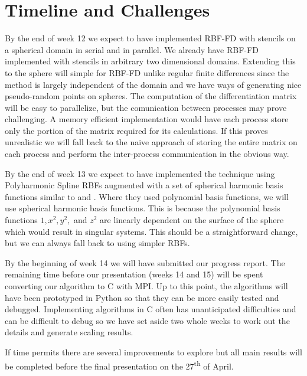 \documentclass[12pt]{article}
\begin{document}
\section{Timeline and Challenges}
	By the end of week 12 we expect to have implemented RBF-FD with stencils on a spherical domain in serial and in parallel. We already have RBF-FD implemented with stencils in arbitrary two dimensional domains. Extending this to the sphere will simple for RBF-FD unlike regular finite differences since the method is largely independent of the domain and we have ways of generating nice pseudo-random points on spheres. The computation of the differentiation matrix will be easy to parallelize, but the comunication between processes may prove challenging. A memory efficient implementation would have each process store only the portion of the matrix required for its calculations. If this proves unrealistic we will fall back to the naive approach of storing the entire matrix on each process and perform the inter-process communication in the obvious way.
	
	By the end of week 13 we expect to have implemented the technique using Polyharmonic Spline RBFs augmented with a set of spherical harmonic basis functions similar to \cite{Flyer2016-1} and \cite{Flyer2017-2}. Where they used polynomial basis functions, we will use spherical harmonic basis functions. This is because the polynomial basis functions $1, x^2, y^2,$ and $z^2$ are linearly dependent on the surface of the sphere which would result in singular systems. This should be a straightforward change, but we can always fall back to using simpler RBFs.
	
	By the beginning of week 14 we will have submitted our progress report. The remaining time before our presentation (weeks 14 and 15) will be spent converting our algorithm to C with MPI. Up to this point, the algorithms will have been prototyped in Python so that they can be more easily tested and debugged. Implementing algorithms in C often has unanticipated difficulties and can be difficult to debug so we have set aside two whole weeks to work out the details and generate scaling results. 
	
	If time permits there are several improvements to explore but all main results will be completed before the final presentation on the 27\textsuperscript{th} of April.
	
\end{document}
